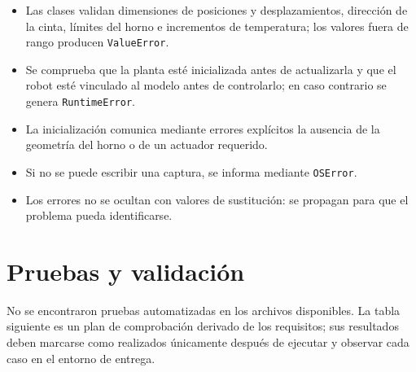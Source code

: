 \documentclass[12pt,a4paper]{article}
\begin{document}
\begin{itemize}
    \item Las clases validan dimensiones de posiciones y desplazamientos, dirección de la cinta, límites del horno e incrementos de temperatura; los valores fuera de rango producen \texttt{ValueError}.
    \item Se comprueba que la planta esté inicializada antes de actualizarla y que el robot esté vinculado al modelo antes de controlarlo; en caso contrario se genera \texttt{RuntimeError}.
    \item La inicialización comunica mediante errores explícitos la ausencia de la geometría del horno o de un actuador requerido.
    \item Si no se puede escribir una captura, se informa mediante \texttt{OSError}.
    \item Los errores no se ocultan con valores de sustitución: se propagan para que el problema pueda identificarse.
\end{itemize}


\section{Pruebas y validación}

No se encontraron pruebas automatizadas en los archivos disponibles. La tabla
siguiente es un plan de comprobación derivado de los requisitos; sus resultados
deben marcarse como realizados únicamente después de ejecutar y observar cada
caso en el entorno de entrega.
\end{document}
